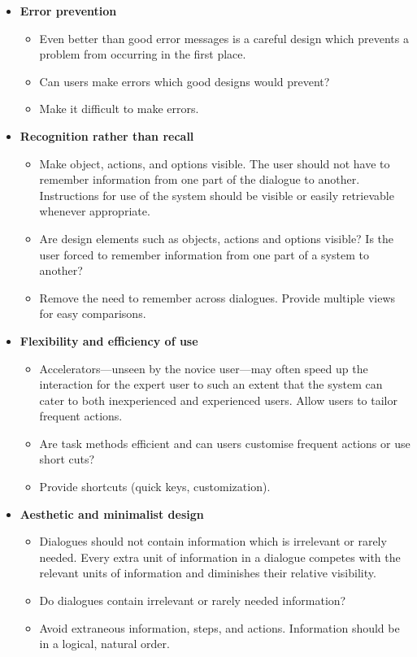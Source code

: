 \begin{itemize}
	\item \textbf{Error prevention}
		\begin{itemize}
			\item Even better than good error messages is a careful design which prevents a problem from occurring in the first place.
			\item Can users make errors which good designs would prevent?
			\item Make it difficult to make errors.
		\end{itemize}
		
	\item \textbf{Recognition rather than recall}
		\begin{itemize}
			\item Make object, actions, and options visible. The user should not have to remember information from one part of the dialogue to another. Instructions for use of the system should be visible or easily retrievable whenever appropriate.
			\item Are design elements such as objects, actions and options visible? Is the user forced to remember information from one part of a system to another?
			\item Remove the need to remember across dialogues. Provide multiple views for easy comparisons.
		\end{itemize}
		
	\item \textbf{Flexibility and efficiency of use}
		\begin{itemize}
			\item Accelerators---unseen by the novice user---may often spe\-ed up the interaction for the expert user to such an extent that the system can cater to both inexperienced and experienced users. Allow users to tailor frequent actions.
			\item Are task methods efficient and can users customise frequent actions or use short cuts?
			\item Provide shortcuts (quick keys, customization).
		\end{itemize}
		
	\item \textbf{Aesthetic and minimalist design}
		\begin{itemize}
			\item Dialogues should not contain information which is irrelevant or rarely needed. Every extra unit of information in a dialogue competes with the relevant units of information and diminishes their relative visibility.
			\item Do dialogues contain irrelevant or rarely needed information?
			\item Avoid extraneous information, steps, and actions. Information should be in a logical, natural order.
		\end{itemize}
		

\end{itemize}

